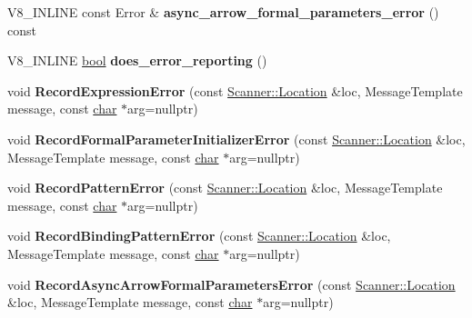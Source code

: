 \begin{DoxyCompactItemize}
V8\+\_\+\+I\+N\+L\+I\+NE const Error \& {\bfseries async\+\_\+arrow\+\_\+formal\+\_\+parameters\+\_\+error} () const
\item 
\mbox{\label{classv8_1_1internal_1_1ExpressionClassifier_a075483a46fa258d1c8876e348a81fe2b}} 
V8\+\_\+\+I\+N\+L\+I\+NE \mbox{\hyperlink{classbool}{bool}} {\bfseries does\+\_\+error\+\_\+reporting} ()
\item 
\mbox{\label{classv8_1_1internal_1_1ExpressionClassifier_a77f7bdd4cd5fddf47224825a2a5c4912}} 
void {\bfseries Record\+Expression\+Error} (const \mbox{\hyperlink{structv8_1_1internal_1_1Scanner_1_1Location}{Scanner\+::\+Location}} \&loc, Message\+Template message, const \mbox{\hyperlink{classchar}{char}} $\ast$arg=nullptr)
\item 
\mbox{\label{classv8_1_1internal_1_1ExpressionClassifier_af05b0c918dc5dbb7c892b14a83f7137d}} 
void {\bfseries Record\+Formal\+Parameter\+Initializer\+Error} (const \mbox{\hyperlink{structv8_1_1internal_1_1Scanner_1_1Location}{Scanner\+::\+Location}} \&loc, Message\+Template message, const \mbox{\hyperlink{classchar}{char}} $\ast$arg=nullptr)
\item 
\mbox{\label{classv8_1_1internal_1_1ExpressionClassifier_a5f72a64ea737f813b5aa9b5295b361e6}} 
void {\bfseries Record\+Pattern\+Error} (const \mbox{\hyperlink{structv8_1_1internal_1_1Scanner_1_1Location}{Scanner\+::\+Location}} \&loc, Message\+Template message, const \mbox{\hyperlink{classchar}{char}} $\ast$arg=nullptr)
\item 
\mbox{\label{classv8_1_1internal_1_1ExpressionClassifier_a1444e90d50a97c5f9a276b7a65ff380d}} 
void {\bfseries Record\+Binding\+Pattern\+Error} (const \mbox{\hyperlink{structv8_1_1internal_1_1Scanner_1_1Location}{Scanner\+::\+Location}} \&loc, Message\+Template message, const \mbox{\hyperlink{classchar}{char}} $\ast$arg=nullptr)
\item 
\mbox{\label{classv8_1_1internal_1_1ExpressionClassifier_a0c05fc8923d064dc89b0920f76601a5a}} 
void {\bfseries Record\+Async\+Arrow\+Formal\+Parameters\+Error} (const \mbox{\hyperlink{structv8_1_1internal_1_1Scanner_1_1Location}{Scanner\+::\+Location}} \&loc, Message\+Template message, const \mbox{\hyperlink{classchar}{char}} $\ast$arg=nullptr)

\end{DoxyCompactItemize}
